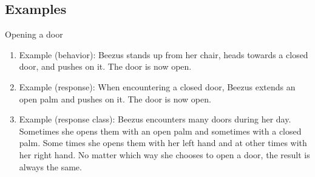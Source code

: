 \subsection{Examples}
Opening a door
\begin{enumerate}
\item Example (behavior):  Beezus stands up from her chair, heads towards a closed door, and pushes on it.  The door is now open.  
\item Example (response): When encountering a closed door, Beezus extends an open palm and pushes on it.  The door is now open.   
\item Example (response class): Beezus encounters many doors during her day. Sometimes she opens them with an open palm and sometimes with a closed palm. Some times she opens them with her left hand and at other times with her right hand.  No matter which way she chooses to open a door, the result is always the same.  
%
\end{enumerate}
%
